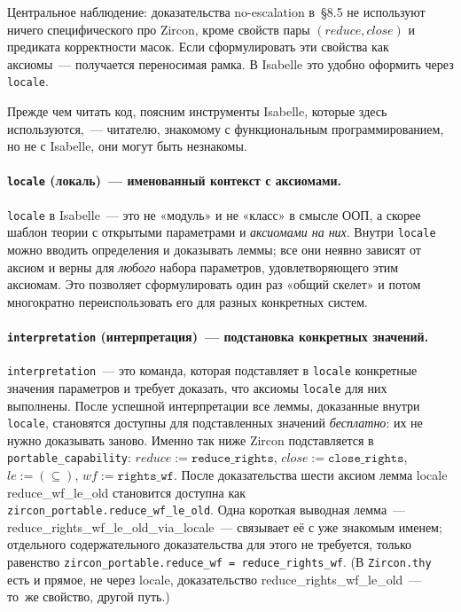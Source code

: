\documentclass[11pt,a4paper]{article}
\newcommand{\isabel}[1]{{\isabelleit #1}}
\newcommand{\lemmaname}[1]{\isabel{#1}}
\begin{document}
Центральное наблюдение: доказательства no-escalation в~§8.5 не используют
ничего специфического про Zircon, кроме свойств пары
$(\mathit{reduce}, \mathit{close})$ и предиката корректности масок. Если
сформулировать эти свойства как аксиомы~--- получается переносимая рамка.
В Isabelle это удобно оформить через \texttt{locale}.

Прежде чем читать код, поясним инструменты Isabelle, которые здесь
используются,~--- читателю, знакомому с функциональным
программированием, но не с Isabelle, они могут быть незнакомы.

\paragraph{\texttt{locale} (локаль)~--- именованный контекст с
	аксиомами.}
\texttt{locale} в Isabelle~--- это не «модуль» и не «класс» в смысле
ООП, а скорее шаблон теории с открытыми параметрами и \emph{аксиомами
	на них}. Внутри \texttt{locale} можно вводить определения и доказывать
леммы; все они неявно зависят от аксиом и верны для \emph{любого}
набора параметров, удовлетворяющего этим аксиомам. Это позволяет
сформулировать один раз «общий скелет» и потом многократно
переиспользовать его для разных конкретных систем.

\paragraph{\texttt{interpretation} (интерпретация)~--- подстановка
	конкретных значений.}
\texttt{interpretation}~--- это команда, которая подставляет в
\texttt{locale} конкретные значения параметров и требует доказать, что
аксиомы \texttt{locale} для них выполнены. После успешной
интерпретации все леммы, доказанные внутри \texttt{locale},
становятся доступны для подставленных значений \emph{бесплатно}: их не
нужно доказывать заново. Именно так ниже Zircon подставляется в
\texttt{portable\_capability}: $\mathit{reduce} := \texttt{reduce\_rights}$,
$\mathit{close} := \texttt{close\_rights}$,
$\mathit{le} := (\subseteq)$,
$\mathit{wf} := \texttt{rights\_wf}$. После доказательства шести аксиом
лемма locale \lemmaname{reduce\_wf\_le\_old} становится доступна как
\texttt{zircon\_portable.reduce\_wf\_le\_old}. Одна короткая
выводная лемма~--- \lemmaname{reduce\_rights\_wf\_le\_old\_via\_locale}~---
связывает её с уже знакомым именем; отдельного содержательного
доказательства для этого не требуется, только равенство
\texttt{zircon\_portable.reduce\_wf = reduce\_rights\_wf}.
(В \texttt{Zircon.thy} есть и прямое, не через locale, доказательство
\lemmaname{reduce\_rights\_wf\_le\_old}~--- то~же свойство, другой путь.)
\end{document}

